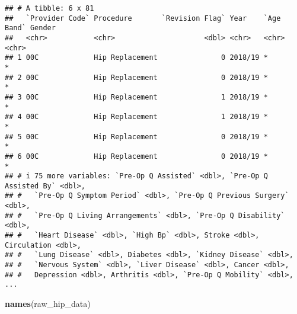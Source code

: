 \documentclass[
]{article}
\newenvironment{Shaded}{\begin{snugshade}}{\end{snugshade}}
\newcommand{\FunctionTok}[1]{\textcolor[rgb]{0.13,0.29,0.53}{\textbf{#1}}}
\newcommand{\NormalTok}[1]{#1}
\begin{document}
\begin{verbatim}
## # A tibble: 6 x 81
##   `Provider Code` Procedure       `Revision Flag` Year    `Age Band` Gender
##   <chr>           <chr>                     <dbl> <chr>   <chr>      <chr> 
## 1 00C             Hip Replacement               0 2018/19 *          *     
## 2 00C             Hip Replacement               0 2018/19 *          *     
## 3 00C             Hip Replacement               1 2018/19 *          *     
## 4 00C             Hip Replacement               1 2018/19 *          *     
## 5 00C             Hip Replacement               0 2018/19 *          *     
## 6 00C             Hip Replacement               0 2018/19 *          *     
## # i 75 more variables: `Pre-Op Q Assisted` <dbl>, `Pre-Op Q Assisted By` <dbl>,
## #   `Pre-Op Q Symptom Period` <dbl>, `Pre-Op Q Previous Surgery` <dbl>,
## #   `Pre-Op Q Living Arrangements` <dbl>, `Pre-Op Q Disability` <dbl>,
## #   `Heart Disease` <dbl>, `High Bp` <dbl>, Stroke <dbl>, Circulation <dbl>,
## #   `Lung Disease` <dbl>, Diabetes <dbl>, `Kidney Disease` <dbl>,
## #   `Nervous System` <dbl>, `Liver Disease` <dbl>, Cancer <dbl>,
## #   Depression <dbl>, Arthritis <dbl>, `Pre-Op Q Mobility` <dbl>, ...
\end{verbatim}

\begin{Shaded}
\begin{Highlighting}[]
\FunctionTok{names}\NormalTok{(raw\_hip\_data)}
\end{Highlighting}
\end{Shaded}
\end{document}
